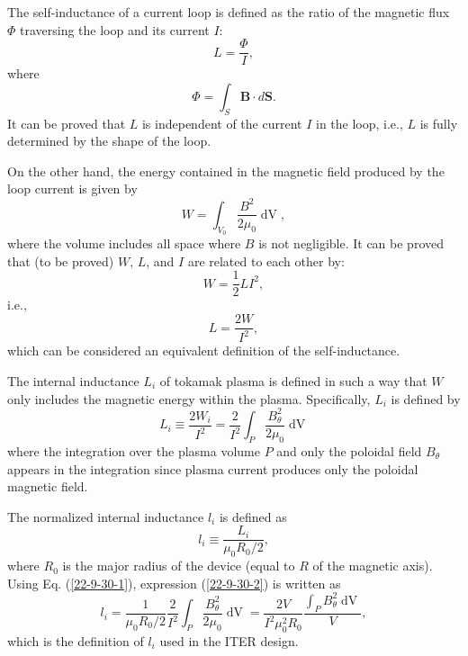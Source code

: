 \documentclass{llncs}
\newcommand{\tmop}[1]{\ensuremath{\operatorname{#1}}}
\begin{document}
The self-inductance of a current loop is defined as the ratio of the magnetic
flux $\Phi$ traversing the loop and its current $I$:
\begin{equation}
  L = \frac{\Phi}{I},
\end{equation}
where
\begin{equation}
  \Phi = \int_S \mathbf{B} \cdot d\mathbf{S}.
\end{equation}
It can be proved that $L$ is independent of the current $I$ in the loop, i.e.,
$L$ is fully determined by the shape of the loop.

On the other hand, the energy contained in the magnetic field produced by the
loop current is given by
\begin{equation}
  W = \int_{V_0} \frac{B^2}{2 \mu_0} \tmop{dV},
\end{equation}
where the volume includes all space where $B$ is not negligible. It can be
proved that (to be proved) $W$, $L$, and $I$ are related to each other by:
\begin{equation}
  W = \frac{1}{2} L I^2,
\end{equation}
i.e.,
\begin{equation}
  L = \frac{2 W}{I^2},
\end{equation}
which can be considered an equivalent definition of the self-inductance.

The internal inductance $L_i$ of tokamak plasma is defined in such a way that
$W$ only includes the magnetic energy within the plasma. Specifically, $L_i$
is defined by
\begin{equation}
  \label{22-9-30-1} L_i \equiv \frac{2 W_i}{I^2} = \frac{2}{I^2} \int_P
  \frac{B^2_{\theta}}{2 \mu_0} \tmop{dV}
\end{equation}
where the integration over the plasma volume $P$ and only the poloidal field
$B_{\theta}$ appears in the integration since plasma current produces only the
poloidal magnetic field.

The normalized internal inductance $l_i$ is defined as
\begin{equation}
  \label{22-9-30-2} l_i \equiv \frac{L_i}{\mu_0 R_0 / 2},
\end{equation}
where $R_0$ is the major radius of the device (equal to $R$ of the magnetic
axis). Using Eq. (\ref{22-9-30-1}), expression (\ref{22-9-30-2}) is written as
\begin{equation}
  \label{22-9-30-4} l_i = \frac{1}{\mu_0 R_0 / 2}  \frac{2}{I^2} \int_P
  \frac{B^2_{\theta}}{2 \mu_0} \tmop{dV} = \frac{2 V}{I^2 \mu_0^2 R_0}
  \frac{\int_P B^2_{\theta} \tmop{dV}}{V},
\end{equation}
which is the definition of $l_i$ used in the ITER design.
\end{document}
